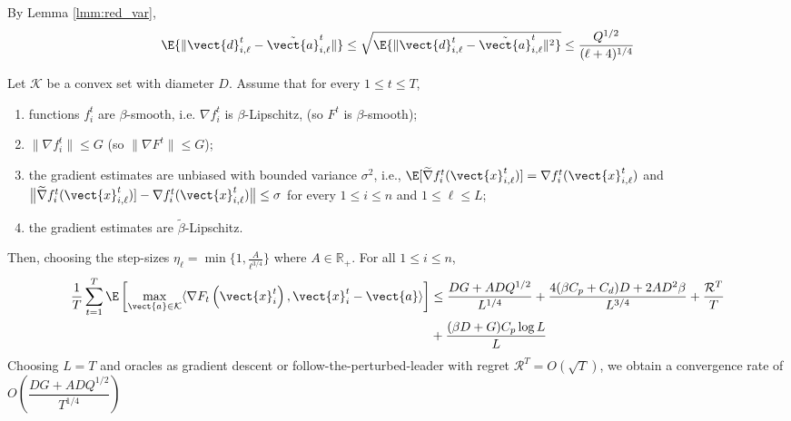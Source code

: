 \begin{claim}
\label{claim:quantized_fw}
By Lemma \ref{lmm:red_var},
\begin{equation*}
    \E{\|\vect{d}^t_{i,\ell} - \Tilde{\vect{a}}^t_{i,\ell} \|} \leq \sqrt{\E{\|\vect{d}^t_{i,\ell} - \Tilde{\vect{a}}^t_{i,\ell} \|^{2}}} \leq \frac{Q^{1/2}}{(\ell + 4)^{1/4}}
\end{equation*}
\end{claim}

\begin{theorem}
\label{thm:stoc}
Let $\mathcal{K}$ be a convex set with diameter $D$. Assume that for every $1 \leq t \leq T$, 
\begin{enumerate}
	\item functions $f^{t}_{i}$ are $\beta$-smooth, i.e. $\nabla f^{t}_{i}$ is $\beta$-Lipschitz,  (so $F^{t}$ is $\beta$-smooth);
	\item $\| \nabla f^{t}_{i}\| \leq G$ (so $\| \nabla F^{t}\| \leq G$);
	\item the gradient estimates are unbiased with bounded variance $\sigma^{2}$, i.e., 
		$\E [\widetilde{\nabla} f^{t}_{i}(\vect{x}^{t}_{i,\ell})] = \nabla f^{t}_{i}(\vect{x}^{t}_{i,\ell})$
		and $\bigl \| \widetilde{\nabla} f^{t}_{i}(\vect{x}^{t}_{i,\ell})] - \nabla f^{t}_{i}(\vect{x}^{t}_{i,\ell}) \bigr \| \leq \sigma$
		for every $1 \leq i \leq n$ and $1 \leq \ell \leq L$;
	\item the gradient estimates are $\widetilde{\beta}$-Lipschitz.
\end{enumerate}
Then, choosing the step-sizes $\eta_\ell = \min \{1, \frac{A}{\ell^{3/4}}\}$ where $A \in \mathbb{R}_+$. For all $1 \leq i \leq n$, 
\begin{align*}
    \frac{1}{T} \sum_{t=1}^T \E\left[ \max_{\vect{a} \in \mathcal{K}} \langle \nabla F_t\left( \vect{x}_i^t \right), \vect{x}_i^t - \vect{a} \rangle \right]
    &\leq \frac{DG + ADQ^{1/2}}{L^{1/4}} + \frac{4(\beta C_p + C_d) D + 2AD^2\beta}{L^{3/4}}
    + \frac{\mathcal{R}^T}{T} \\
    &+ \frac{(\beta D + G)C_p \log L}{L}
\end{align*}
Choosing $L=T$ and oracles as gradient descent or follow-the-perturbed-leader with regret $\mathcal{R}^T =
O\left(\sqrt{T}\right)$, we obtain a convergence rate of $O\left( \dfrac{DG + ADQ^{1/2}}{T^{1/4}} \right)$

\end{theorem}


